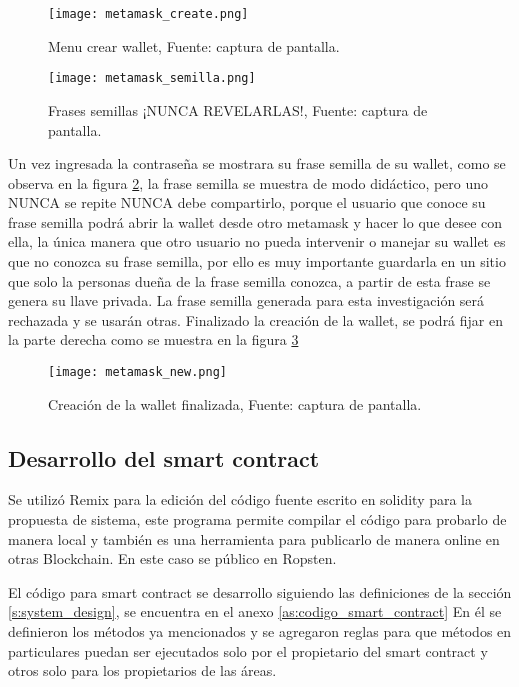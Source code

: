 \begin{figure}[hbt!]
  \centering
  {\texttt{[image: metamask\_create.png]}}
  \caption{Menu crear wallet, Fuente: captura de pantalla. }
  \label{img:metamask_create}
\end{figure}

\begin{figure}[hbt!]
  \centering
  {\texttt{[image: metamask\_semilla.png]}}
  \caption{Frases semillas ¡NUNCA REVELARLAS!, Fuente: captura de pantalla. }
  \label{img:metamask_semilla}
\end{figure}

Un vez ingresada la contraseña se mostrara su frase semilla de su wallet, como se observa en la figura \ref{img:metamask_semilla},
la frase semilla se muestra de modo didáctico, pero uno NUNCA se repite NUNCA debe compartirlo, porque 
el usuario que conoce su frase semilla podrá abrir la wallet desde otro metamask y hacer lo que desee con ella,
la única manera que otro usuario no pueda intervenir o manejar su wallet es que no conozca su frase semilla, 
por ello es muy importante guardarla en un sitio que solo la personas dueña de la frase semilla conozca,  
a partir de esta frase se genera su llave privada.
La frase semilla generada para esta investigación será rechazada y se usarán otras.
Finalizado la creación de la wallet, se podrá fijar en la parte derecha como se muestra en la figura \ref{img:metamask_new}
\begin{figure}[hbt!]
  \centering
  {\texttt{[image: metamask\_new.png]}}
  \caption{Creación de la wallet finalizada, Fuente: captura de pantalla. }
  \label{img:metamask_new}
\end{figure}


\subsection{Desarrollo del smart contract}
Se utilizó Remix para  la edición del código fuente escrito en solidity para la propuesta de sistema, este programa 
permite compilar el código para probarlo de manera local y también es una herramienta para publicarlo de manera online en otras Blockchain.
En este caso se público en Ropsten.

El código para smart contract se desarrollo siguiendo las definiciones de la sección \ref{s:system_design}, se encuentra en el anexo \ref{as:codigo_smart_contract}
En él se definieron los métodos ya mencionados y se agregaron reglas para que métodos en particulares puedan ser ejecutados solo por el propietario del smart contract y otros 
solo para los propietarios de las áreas.

